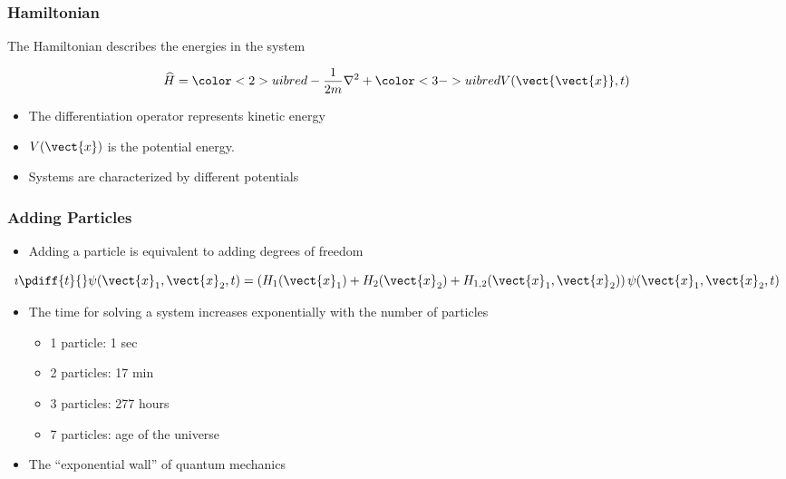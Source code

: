 \documentclass{beamer}
\begin{document}
\begin{frame}
	\frametitle{Hamiltonian}

	The Hamiltonian describes the energies in the system
	\parbox[c][2cm]{\textwidth} 
	{
		\begin{equation*}
			\widehat{H} = {\color<2>{uibred} -\frac{1}{2m} \nabla^2} + {\color<3->{uibred} V(\vect{\vect{x}}, t)}
		\end{equation*}

	}
	\begin{itemize}
		\item<2-> The differentiation operator represents kinetic energy
		\item<3-> $V(\vect{x})$ is the potential energy.
		\item<4-> Systems are characterized by different potentials
	\end{itemize}

\end{frame}


\begin{frame}
	\frametitle{Adding Particles}

	\begin{itemize}
		\item Adding a particle is equivalent to adding degrees of freedom
	\end{itemize}
	{
	\begin{equation*}
		\imath \pdiff{t}{}\psi(\vect{x}_1, \vect{x}_2, t) = \left(H_1(\vect{x}_1) + H_2(\vect{x}_2) + H_{1,2}(\vect{x}_1, \vect{x}_2) \right) \psi(\vect{x}_1, \vect{x}_2, t) 
	\end{equation*}
	}
	\begin{itemize}
		\item<3-> The time for solving a system increases exponentially with the number of particles
		\begin{itemize}
			\item<4-> 1 particle: 1 sec
			\item<5-> 2 particles: 17 min
			\item<6-> 3 particles: 277 hours
			\item<7-> 7 particles: age of the universe
		\end{itemize}
		\item<8-> The ``exponential wall'' of quantum mechanics
	\end{itemize}
	
\end{frame}
\end{document}
